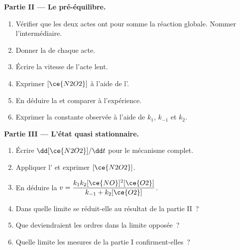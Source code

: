\begin{problem}
\medskip
\noindent\textbf{Partie II --- Le pré-équilibre.}
\begin{enumerate}[resume]
  \item Vérifier que les deux actes ont pour somme la réaction globale.
        Nommer l'intermédiaire.
  \item Donner la  de chaque acte.
  \item Écrire la vitesse de l'acte lent.
  \item Exprimer $[\ce{N2O2}]$ à l'aide de l'.
  \item En déduire la  et comparer à l'expérience.
  \item Exprimer la constante observée à l'aide de $k_1$, $k_{-1}$ et
        $k_2$.
\end{enumerate}

\medskip
\noindent\textbf{Partie III --- L'état quasi stationnaire.}
\begin{enumerate}[resume]
  \item Écrire $\dd[\ce{N2O2}]/\dd t$ pour le mécanisme complet.
  \item Appliquer l' et
        exprimer $[\ce{N2O2}]$.
  \item En déduire la  $v = \dfrac{k_1k_2[\ce{NO}]^2[\ce{O2}]}{k_{-1} +
        k_2[\ce{O2}]}$.
  \item Dans quelle limite se réduit-elle au résultat de la partie II~?
  \item Que deviendraient les ordres dans la limite opposée~?
  \item Quelle limite les mesures de la partie I confirment-elles~?
\end{enumerate}


\end{problem}

